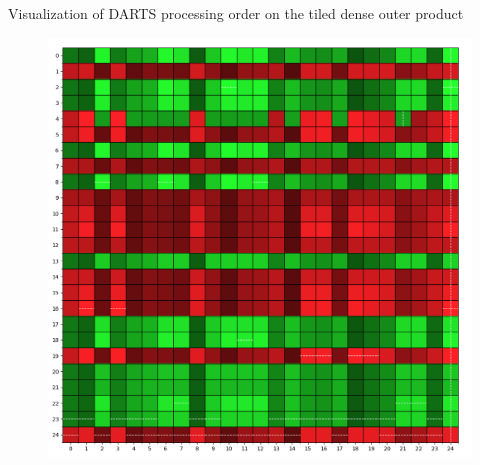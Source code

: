 \documentclass{libs/ufc_format}
\begin{document}
\begin{frame}[noframenumbering]{Visualization of DARTS processing order on the tiled dense outer product}
	\begin{figure}
		\center\includegraphics[scale = 0.17]{Images/cutDDA.png}
	\end{figure}

\end{frame}
\end{document}

